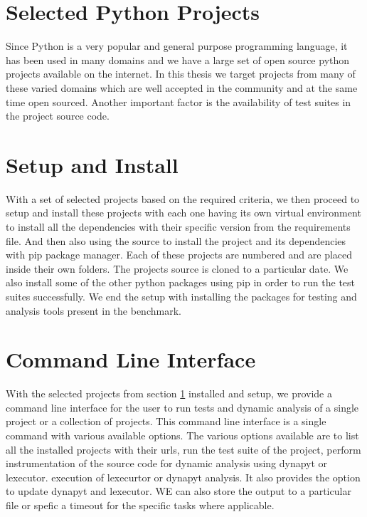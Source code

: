 \section{Selected Python Projects}
\label{approach:selection of projects}
Since Python is a very popular and general purpose programming language, it has been used in many domains and we have a large set of open source python projects available on the internet. In this thesis we target projects from many of these varied domains which are well accepted in the community and at the same time open sourced. Another important factor is the availability of test suites in the project source code. 

\section{Setup and Install}
\label{approach:setup and install}
With a set of selected projects based on the required criteria, we then proceed to setup and install these projects with each one having its own virtual environment to install all the dependencies with their specific version from the requirements file. And then also using the source to install the project and its dependencies with pip package manager. Each of these projects are numbered and are placed inside their own folders. The projects source is cloned to a particular date. We also install some of the other python packages using pip in order to run the test suites successfully. We end the setup with installing the packages for testing and analysis tools present in the benchmark.

\section{Command Line Interface}
\label{approach:command line interface}
With the selected projects from section \ref{approach:selection of projects} installed and setup, we provide a command line interface for the user to run tests and dynamic analysis of a single project or a collection of projects. This command line interface is a single command with various available options. The various options available are to list all the installed projects with their urls, run the test suite of the project, perform instrumentation of the source code for dynamic analysis using dynapyt or lexecutor. execution of lexecurtor or dynapyt analysis. It also provides the option to update dynapyt and lexecutor. WE can also store the output to a particular file or spefic a timeout for the specific tasks where applicable. 

